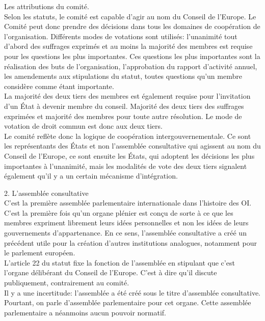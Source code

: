 \documentclass[10pt, a4paper, openany]{book}
\begin{document}
Les attributions du comité. \\
Selon les statuts, le comité est capable d'agir au nom du Conseil de l'Europe. Le Comité peut donc prendre des décisions dans tous les domaines de coopération de l'organisation. Différents modes de votations sont utilisés: l'unanimité tout d'abord des suffrages exprimés et au moins la majorité des membres est requise pour les questions les plus importantes. Ces questions les plus importantes sont la réalisation des buts de l'organisation, l'approbation du rapport d'activité annuel, les amendements aux stipulations du statut, toutes questions qu'un membre considère comme étant importante. \\
La majorité des deux tiers des membres est également requise pour l'invitation d'un État à devenir membre du conseil. Majorité des deux tiers des suffrages exprimées et majorité des membres pour toute autre résolution. Le mode de votation de droit commun est donc aux deux tiers. \\
Le comité reflète donc la logique de coopération intergouvernementale. Ce sont les représentants des États et non l'assemblée consultative qui agissent au nom du Conseil de l'Europe, ce sont ensuite les États, qui adoptent les décisions les plus importantes à l'unanimité, mais les modalités de vote des deux tiers signalent également qu'il y a un certain mécanisme d'intégration. 


2. L'assemblée consultative \\
C'est la première assemblée parlementaire internationale dans l'histoire des OI. C'est la première fois qu'un organe plénier est conçu de sorte à ce que les membres expriment librement leurs idées personnelles et non les idées de leurs gouvernements d'appartenance. En ce sens, l'assemblée consultative a créé un précédent utile pour la création d'autres institutions analogues, notamment pour le parlement européen. \\
L'article 22 du statut fixe la fonction de l'assemblée en stipulant que c'est l'organe délibérant du Conseil de l'Europe. C'est à dire qu'il discute publiquement, contrairement au comité. \\
Il y a une incertitude: l'assemblée a été créé sous le titre d'assemblée consultative. Pourtant, on parle d'assemblée parlementaire pour cet organe. Cette assemblée parlementaire a néanmoins aucun pouvoir normatif. 
\end{document}
